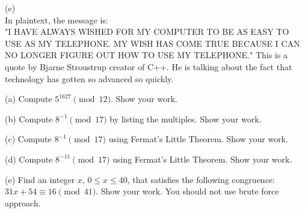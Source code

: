 \documentclass[11pt]{article}
\begin{document}
\begin{solution}
    \medskip\noindent
    (e) \\In plaintext, the message is:\\
    "I HAVE ALWAYS WISHED FOR MY COMPUTER TO BE AS EASY TO USE AS MY TELEPHONE. 
    MY WISH HAS COME TRUE BECAUSE I CAN NO LONGER FIGURE OUT 
    HOW TO USE MY TELEPHONE." This is a quote by Bjarne Stroustrup creator of C++.
    He is talking about the fact that technology has gotten so advanced so quickly.




\end{solution}

\pagebreak
\begin{problem} %
 	

    \medskip\noindent
    (a) Compute $5^{1627}\pmod{12}$. Show your work.
    
    \medskip\noindent
    (b) Compute $8^{-1}\pmod{17}$ by listing the multiples. Show your work.
    
    \medskip\noindent
    (c) Compute $8^{-1}\pmod{17}$ using Fermat's Little Theorem. Show your work.
    
    \medskip\noindent
    (d) Compute $8^{-11}\pmod{17}$ using Fermat's Little Theorem. Show your work.
    
    \medskip\noindent
    (e) Find an integer $x$, $0\le x \le 40$, that satisfies the following congruence:
    $31x + 54 \equiv 16 \pmod{41}$. Show your work. You should not use brute force approach.
    

\end{problem}
\end{document}
